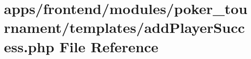 \hypertarget{poker__tournament_2templates_2add_player_success_8php}{\section{apps/frontend/modules/poker\-\_\-tournament/templates/add\-Player\-Success.php File Reference}
\label{poker__tournament_2templates_2add_player_success_8php}
}
